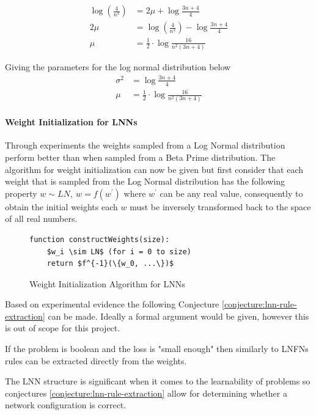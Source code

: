 \begin{align*}
	\log(\frac{4}{n^2}) &= 2\mu + \log \frac{3n + 4}{4}\\
	2\mu &= \log(\frac{4}{n^2}) - \log \frac{3n + 4}{4}\\
	\mu &= \frac{1}{2} \cdot \log \frac{16}{n^2(3n + 4)}
\end{align*}

Giving the parameters for the log normal distribution below
\begin{align}
	\sigma^2 &= \log \frac{3n + 4}{4}\\
	\mu &= \frac{1}{2} \cdot \log \frac{16}{n^2(3n + 4)}
\end{align}


\paragraph{Weight Initialization for LNNs}
Through experiments the weights sampled from a Log Normal distribution perform better than when sampled from a Beta Prime distribution. The algorithm for weight initialization can now be given but first consider that each weight that is sampled from the Log Normal distribution has the following property $w \sim LN,\ w = f(w^{'})$ where $w^{'}$ can be any real value, consequently to obtain the initial weights each $w$ must be inversely transformed back to the space of all real numbers.

\begin{figure}[H]
	\begin{lstlisting}[mathescape=true]
  function constructWeights(size):
    $w_i \sim LN$ (for i = 0 to size)
    return $f^{-1}(\{w_0, ...\})$
	\end{lstlisting}
	\caption{Weight Initialization Algorithm for LNNs}
	\label{alg:lnn-initlization}
\end{figure}

Based on experimental evidence the following Conjecture \ref{conjecture:lnn-rule-extraction} can be made. Ideally a formal argument would be given, however this is out of scope for this project.

\begin{conjecture}
	If the problem is boolean and the loss is "small enough" then similarly to LNFNs rules can be extracted directly from the weights.
	\label{conjecture:lnn-rule-extraction}
\end{conjecture}

The LNN structure is significant when it comes to the learnability of problems so conjectures \ref{conjecture:lnn-rule-extraction} allow for determining whether a network configuration is correct.


